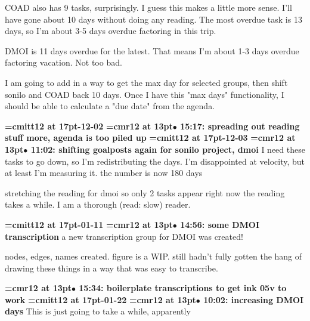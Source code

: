 COAD also has 9 tasks, surprisingly. I guess this makes a little more sense. I'll have gone about 10 days without doing any reading. The most overdue task is 13 days, so I'm about 3-5 days overdue factoring in this trip.
\par

DMOI is 11 days overdue for the latest. That means I'm about 1-3 days overdue factoring vacation. Not too bad.
\par

I am going to add in a way to get the max day for selected groups, then shift sonilo and COAD back 10 days. Once I have this "max days" functionality, I should be able to calculate a "due date" from the agenda.
\par

{\medskip\noindent\bf\font\titlefont=cmitt12 at 17pt-12-02}\medskip
{\smallskip\noindent\bf\font\titlefont=cmr12 at 13pt\titlefont $\bullet$ 15:17: spreading out reading stuff more, agenda is too piled up}\smallskip
{\medskip\noindent\bf\font\titlefont=cmitt12 at 17pt-12-03}\medskip
{\smallskip\noindent\bf\font\titlefont=cmr12 at 13pt\titlefont $\bullet$ 11:02: shifting goalposts again for sonilo project, dmoi}\smallskip
I need these tasks to go down, so I'm redistributing the days. I'm disappointed at velocity, but at least I'm measuring it. the number is now 180 days
\par

stretching the reading for dmoi so only 2 tasks appear right now the reading takes a while. I am a thorough (read: slow) reader.
\par

{\medskip\noindent\bf\font\titlefont=cmitt12 at 17pt-01-11}\medskip
{\smallskip\noindent\bf\font\titlefont=cmr12 at 13pt\titlefont $\bullet$ 14:56: some DMOI transcription}\smallskip
a new transcription group for DMOI was created!
\par

nodes, edges, names created. figure is a WIP. still hadn't fully gotten the hang of drawing these things in a way that was easy to transcribe.
\par

{\smallskip\noindent\bf\font\titlefont=cmr12 at 13pt\titlefont $\bullet$ 15:34: boilerplate transcriptions to get ink 05v to work}\smallskip
{\medskip\noindent\bf\font\titlefont=cmitt12 at 17pt-01-22}\medskip
{\smallskip\noindent\bf\font\titlefont=cmr12 at 13pt\titlefont $\bullet$ 10:02: increasing DMOI days}\smallskip
This is just going to take a while, apparently
\par


